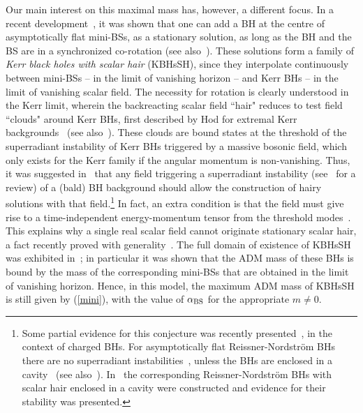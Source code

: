 Our main interest on this maximal mass has, however, a different focus. In a recent development~\cite{Herdeiro:2014goa,Herdeiro:2015gia}, it was shown that one can add a BH at the centre of asymptotically flat mini-BSs, as a stationary solution, as long as the BH and the BS are in a synchronized co-rotation (see also~\cite{Dias:2011at}). These solutions form a family of \textit{Kerr black holes with scalar hair} (KBHsSH), since they interpolate continuously between mini-BSs -- in the limit of vanishing horizon -- and Kerr BHs -- in the limit of vanishing scalar field. The necessity for rotation is clearly understood in the Kerr limit, wherein the backreacting scalar field ``hair" reduces to test field ``clouds" around Kerr BHs, first described by Hod for extremal Kerr backgrounds~\cite{Hod:2012px} (see also~\cite{Hod:2013zza,Herdeiro:2014goa,Hod:2014baa,Benone:2014ssa,Hod:2014npa,Hod:2015ota}). These clouds are bound states at the threshold of the superradiant instability of Kerr BHs triggered by a massive bosonic field, which only exists for the Kerr family if the angular momentum is non-vanishing. Thus, it was suggested in~\cite{Herdeiro:2014goa,Herdeiro:2014ima} that any field triggering a superradiant instability (see~\cite{Brito:2015oca} for a review) of a (bald) BH background should allow the construction of hairy solutions with that field.\footnote{Some partial evidence for this conjecture was recently presented~\cite{Ponglertsakul:2015bpa}, in the context of charged BHs. For asymptotically flat Reissner-Nordstr\"om BHs there are no superradiant instabilities~\cite{Hod:2013eea,Hod:2013nn,Degollado:2013eqa}, unless the BHs are enclosed in a cavity~\cite{Herdeiro:2013pia,Hod:2013fvl,Degollado:2013bha} (see also~\cite{Li:2014xxa,Li:2014fna,Li:2015mqa}). In~\cite{Ponglertsakul:2015bpa} the corresponding Reissner-Nordstr\"om BHs with scalar hair enclosed in a cavity were constructed and evidence for their stability was presented.} 
%
In fact, an extra condition is that the field must give rise to a time-independent energy-momentum tensor from the threshold modes~\cite{Herdeiro:2015gia}. This explains why a single real scalar field cannot originate stationary scalar hair, a fact recently proved with generality~\cite{Graham:2014ina}. The full domain of existence of KBHsSH was exhibited in~\cite{Herdeiro:2014goa}; in particular it was shown that the ADM mass of these BHs is bound by the mass of the corresponding mini-BSs that are obtained in the limit of vanishing horizon. Hence, in this model, the maximum ADM mass of KBHsSH  is still given by (\ref{mini}), with the value of $\alpha_{\rm BS}$ for the appropriate $m\neq 0$.


